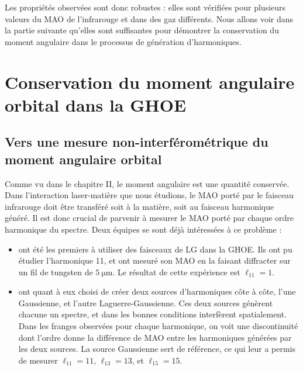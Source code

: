 Les propriétés observées sont donc robustes : elles sont vérifiées pour plusieurs valeurs du MAO de l'infrarouge et dans des gaz différents. Nous allons voir dans la partie suivante qu'elles sont suffisantes pour démontrer la conservation du moment angulaire dans le processus de génération d'harmoniques.

\chapter{Conservation du moment angulaire orbital dans la GHOE}
\section{Vers une mesure non-interférométrique du moment angulaire orbital}
Comme vu dans le chapitre II, le moment angulaire est une quantité conservée. Dans l'interaction laser-matière que nous étudions, le MAO porté par le faisceau infrarouge doit être transféré soit à la matière, soit au faisceau harmonique généré. Il est donc crucial de parvenir à mesurer le MAO porté par chaque ordre harmonique du spectre. Deux équipes se sont déjà intéressées à ce problème :

\begin{itemize} 
\item {} ont été les premiers à utiliser des faisceaux de LG dans la GHOE. Ils ont pu étudier l'harmonique 11, et ont mesuré son MAO en la faisant diffracter sur un fil de tungsten de $\SI{5}{\micro\m}$. Le résultat de cette expérience est $\ell_{11}=1$.\\
\item {} ont quant à eux choisi de créer deux sources d'harmoniques côte à côte, l'une Gaussienne, et l'autre Laguerre-Gaussienne. Ces deux sources génèrent chacune un spectre, et dans les bonnes conditions interfèrent spatialement. Dans les franges observées pour chaque harmonique, on voit une discontinuité dont l'ordre donne la différence de MAO entre les harmoniques générées par les deux sources. La source Gaussienne sert de référence, ce qui leur a permis de mesurer $\ell_{11}=11$, $\ell_{13}=13$, et $\ell_{15}=15$.\\
\end{itemize}

